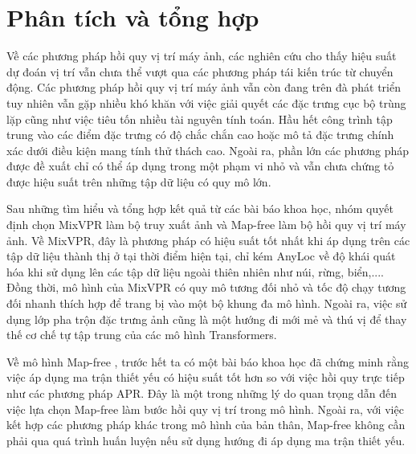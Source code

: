 \section{Phân tích và tổng hợp}
Về các phương pháp hồi quy vị trí máy ảnh, các nghiên cứu cho thấy hiệu suất dự đoán vị trí vẫn chưa thể vượt qua các phương pháp tái kiến trúc từ chuyển động. Các phương pháp hồi quy vị trí máy ảnh vẫn còn đang trên đà phát triển tuy nhiên vẫn gặp nhiều khó khăn với việc giải quyết các đặc trưng cục bộ trùng lặp cũng như việc tiêu tốn nhiều tài nguyên tính toán. Hầu hết công trình tập trung vào các điểm đặc trưng có độ chắc chắn cao hoặc mô tả đặc trưng chính xác dưới điều kiện mang tính thử thách cao. Ngoài ra, phần lớn các phương pháp được đề xuất chỉ có thể áp dụng trong một phạm vi nhỏ và vẫn chưa chứng tỏ được hiệu suất trên những tập dữ liệu có quy mô lớn.

Sau những tìm hiểu và tổng hợp kết quả từ các bài báo khoa học, nhóm quyết định chọn MixVPR \cite{alibey2023mixvpr} làm bộ truy xuất ảnh và Map-free \cite{arnold2022mapfree} làm bộ hồi quy vị trí máy ảnh. Về MixVPR, đây là phương pháp có hiệu suất tốt nhất khi áp dụng trên các tập dữ liệu thành thị ở tại thời điểm hiện tại, chỉ kém AnyLoc \cite{keetha2023anyloc} về độ khái quát hóa khi sử dụng lên các tập dữ liệu ngoài thiên nhiên như núi, rừng, biển,.... Đồng thời, mô hình của MixVPR có quy mô tương đối nhỏ và tốc độ chạy tương đối nhanh thích hợp để trang bị vào một bộ khung đa mô hình. Ngoài ra, việc sử dụng lớp pha trộn đặc trưng ảnh cũng là một hướng đi mới mẻ và thú vị để thay thế cơ chế tự tập trung của các mô hình Transformers.

Về mô hình Map-free \cite{arnold2022mapfree}, trước hết ta có một bài báo khoa học \cite{sattler2019understanding} đã chứng minh rằng việc áp dụng ma trận thiết yếu có hiệu suất tốt hơn so với việc hồi quy trực tiếp như các phương pháp APR. Đây là một trong những lý do quan trọng dẫn đến việc lựa chọn Map-free làm bước hồi quy vị trí trong mô hình. Ngoài ra, với việc kết hợp các phương pháp khác trong mô hình của bản thân, Map-free không cần phải qua quá trình huấn luyện nếu sử dụng hướng đi áp dụng ma trận thiết yếu.

